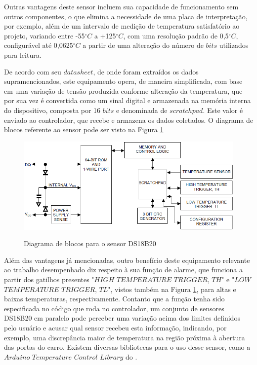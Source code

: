 \documentclass[acronym,symbols]{fei}
\begin{document}
Outras vantagens deste sensor incluem sua capacidade de funcionamento sem outros componentes, o que elimina a necessidade de uma placa de interpretação, por exemplo, além de um intervalo de medição de temperatura satisfatório ao projeto, variando entre -55$^{\circ}C$ a +125$^{\circ}C$, com uma resolução padrão de 0,5$^{\circ}C$, configurável até 0,0625$^{\circ}C$ a partir de uma alteração do número de $bits$ utilizados para leitura. 

De acordo com seu $datasheet$, de onde foram extraídos os dados supramencionados, este equipamento opera, de maneira simplificada, com base em uma variação de tensão produzida conforme alteração da temperatura, que por sua vez é convertida como um sinal digital e armazenada na memória interna do dispositivo, composta por 16 $bits$ e denominada de $scratchpad$. Este valor é enviado ao controlador, que recebe e armazena os dados coletados. O diagrama de blocos referente ao sensor pode ser visto na Figura \ref{fig:DiagBlocTemp} 

\begin{figure}[!htb]
\centering
    \caption{Diagrama de blocos para o sensor DS18B20}
    \includegraphics[width=0.8\linewidth]{Imagens/DiagBlocTemp.png}
    \label{fig:DiagBlocTemp}
\end{figure}

Além das vantagens já mencionadas, outro benefício deste equipamento relevante ao trabalho desempenhado diz respeito à sua função de alarme, que funciona a partir dos gatilhos presentes "$HIGH$ $TEMPERATURE$ $TRIGGER$, $TH$" e "$LOW$ $TEMPERATURE$ $TRIGGER$, $TL$", vistos também na Figura \ref{fig:DiagBlocTemp}, para altas e baixas temperaturas, respectivamente. Contanto que a função tenha sido especificada no código que roda no controlador, um conjunto de sensores DS18B20 em paralelo pode perceber uma variação acima dos limites definidos pelo usuário e acusar qual sensor recebeu esta informação, indicando, por exemplo, uma discrepância maior de temperatura na região próxima à abertura das portas do carro. Existem diversas bibliotecas para o uso desse sensor, como a $Arduino$ $Temperature$ $Control$ $Library$ do \textcite{Arduino-Temperature-Control-Library}.
\end{document}
